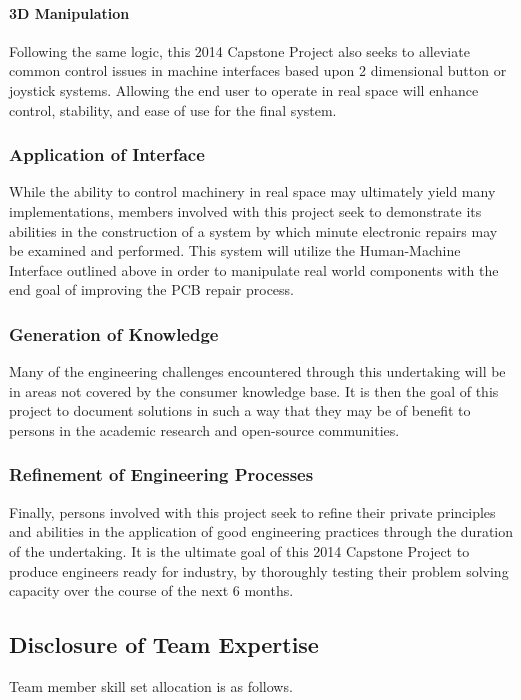\documentclass[11pt]{report}
\begin{document}
\paragraph{3D Manipulation}
Following the same logic, this 2014 Capstone Project also seeks to alleviate common control issues in machine interfaces based upon 2 dimensional button or joystick systems. Allowing the end user to operate in real space will enhance control, stability, and ease of use for the final system.

\subsubsection{Application of Interface}
\par While the ability to control machinery in real space may ultimately yield many implementations, members involved with this project seek to demonstrate its abilities in the construction of a system by which minute electronic repairs may be examined and performed. This system will utilize the Human-Machine Interface outlined above in order to manipulate real world components with the end goal of improving the PCB repair process.

\subsubsection{Generation of Knowledge}
\par Many of the engineering challenges encountered through this undertaking will be in areas not covered by the consumer knowledge base. It is then the goal of this project to document solutions in such a way that they may be of benefit to persons in the academic research and open-source communities.

\subsubsection{Refinement of Engineering Processes}
\par Finally, persons involved with this project seek to refine their private principles and abilities in the application of good engineering practices through the duration of the undertaking. It is the ultimate goal of this 2014 Capstone Project to produce engineers ready for industry, by thoroughly testing their problem solving capacity over the course of the next 6 months.

\newpage
\subsection{Disclosure of Team Expertise}
Team member skill set allocation is as follows.
\end{document}
